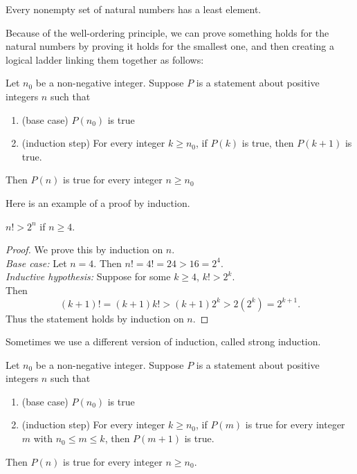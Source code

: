 \documentclass{article}
\begin{document}
\begin{theorem}
Every nonempty set of natural numbers has a least element.
\end{theorem}

Because of the well-ordering principle, we can prove something holds for the natural numbers by proving it holds for the smallest one, and then creating a logical ladder linking them together as follows:

\begin{theorem}
Let $n_0$ be a non-negative integer. Suppose $P$ is a statement about positive integers $n$ such that 
\begin{enumerate}
\item(base case) $P(n_0)$ is true 
\item (induction step) For every integer $k \geq n_0$, if $P(k)$ is true, then $P(k+1)$ is true.
\end{enumerate}
Then $P(n)$ is true for every integer $n \geq n_0$
\end{theorem}

Here is an example of a proof by induction.

\begin{example}
$n! > 2^n$ if $n \geq 4$.
\end{example}

\begin{proof}
We prove this by induction on $n$. \\
{\it Base case:} Let $n = 4$. Then $n! = 4! = 24 > 16 = 2^4$. \\
{\it Inductive hypothesis:} Suppose for some $k \geq 4$, $k! > 2^k$. \\
Then
$$(k+1)! = (k+1) k! > (k+1) 2^k > 2 (2^k) = 2^{k+1}.$$
Thus the statement holds by induction on $n$.
\end{proof}

Sometimes we use a different version of induction, called strong induction.  

\begin{theorem}
Let $n_0$ be a non-negative integer.  Suppose $P$ is a statement about positive integers $n$ such that
\begin{enumerate}
\item(base case) $P(n_0)$ is true 
\item (induction step) For every integer $k \geq n_0$, if $P(m)$ is true for every integer $m$ with $n_0 \leq m \leq k$, then $P(m+1)$ is true.
\end{enumerate}
Then $P(n)$ is true for every integer $n \geq n_0$.
\end{theorem}
\end{document}
